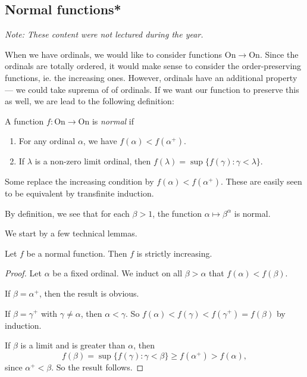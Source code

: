 \documentclass[a4paper]{article}
\begin{document}
\subsection{Normal functions*}
\begin{own}
  \emph{Note: These content were not lectured during the year.}

  When we have ordinals, we would like to consider functions $\mathrm{On} \to \mathrm{On}$. Since the ordinals are totally ordered, it would make sense to consider the order-preserving functions, ie. the increasing ones. However, ordinals have an additional property --- we could take suprema of of ordinals. If we want our function to preserve this as well, we are lead to the following definition:

  \begin{defi}
    A function $f: \mathrm{On} \to \mathrm{On}$ is \emph{normal} if
    \begin{enumerate}
      \item For any ordinal $\alpha$, we have $f(\alpha) < f(\alpha^+)$.
      \item If $\lambda$ is a non-zero limit ordinal, then $f(\lambda) = \sup \{f(\gamma): \gamma < \lambda\}$.
    \end{enumerate}
  \end{defi}
  Some replace the increasing condition by $f(\alpha) < f(\alpha^+)$. These are easily seen to be equivalent by transfinite induction.

  \begin{eg}
    By definition, we see that for each $\beta > 1$, the function $\alpha \mapsto \beta^\alpha$ is normal.
  \end{eg}

  We start by a few technical lemmas.
  \begin{lemma}
    Let $f$ be a normal function. Then $f$ is strictly increasing.
  \end{lemma}

  \begin{proof}
    Let $\alpha$ be a fixed ordinal. We induct on all $\beta > \alpha$ that $f(\alpha) < f(\beta)$.

    If $\beta = \alpha^+$, then the result is obvious.

    If $\beta = \gamma^+$ with $\gamma \not= \alpha$, then $\alpha < \gamma$. So $f(\alpha) < f(\gamma) < f(\gamma^+) = f(\beta)$ by induction.

    If $\beta$ is a limit and is greater than $\alpha$, then
    \[
      f(\beta) = \sup\{f(\gamma): \gamma < \beta\} \geq f(\alpha^+) > f(\alpha),
    \]
    since $\alpha^+ < \beta$. So the result follows.
  \end{proof}


\end{own}
\end{document}
